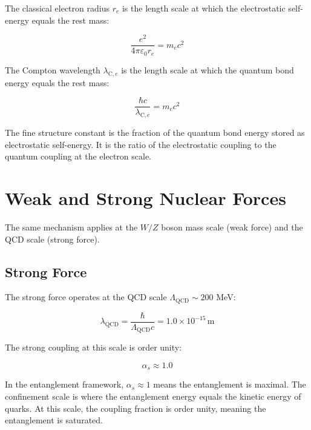 \documentclass[11pt,letterpaper]{article}
\newcommand{\lambdace}{\lambda_{\mathrm{C},e}}
\begin{document}
The classical electron radius $r_e$ is the length scale at which the electrostatic self-energy equals the rest mass:

\begin{equation}
  \frac{e^2}{4\pi\varepsilon_0 r_e} = m_e c^2
  \label{eq:classical_radius}
\end{equation}

The Compton wavelength $\lambdace$ is the length scale at which the quantum bond energy equals the rest mass:

\begin{equation}
  \frac{\hbar c}{\lambdace} = m_e c^2
  \label{eq:compton_wavelength}
\end{equation}

The fine structure constant is the fraction of the quantum bond energy stored as electrostatic self-energy. It is the ratio of the electrostatic coupling to the quantum coupling at the electron scale.

\section{Weak and Strong Nuclear Forces}

The same mechanism applies at the $W/Z$ boson mass scale (weak force) and the QCD scale (strong force).

\subsection{Strong Force}

The strong force operates at the QCD scale $\Lambda_{\mathrm{QCD}} \sim 200$ MeV:

\begin{equation}
  \lambda_{\mathrm{QCD}} = \frac{\hbar}{\Lambda_{\mathrm{QCD}} c}
  = 1.0 \times 10^{-15}\,\mathrm{m}
  \label{eq:qcd_length}
\end{equation}

The strong coupling at this scale is order unity:

\begin{equation}
  \alpha_s \approx 1.0
  \label{eq:alpha_s}
\end{equation}

In the entanglement framework, $\alpha_s \approx 1$ means the entanglement is maximal. The confinement scale is where the entanglement energy equals the kinetic energy of quarks. At this scale, the coupling fraction is order unity, meaning the entanglement is saturated.
\end{document}
